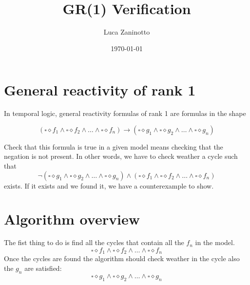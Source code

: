 \documentclass[11pt]{article}
\author{Luca Zaninotto}
\date{\today}
\title{GR(1) Verification}
\begin{document}
\maketitle
\tableofcontents

\section{General reactivity of rank 1}
\label{sec:org2691051}
In temporal logic, general reactivity formulas of rank 1 are
formulas in the shape

\[(\square\diamond f_1 \wedge \square\diamond f_2 \wedge \dots \wedge
  \square\diamond f_n) \rightarrow (\square\diamond g_1 \wedge
  \square\diamond g_2 \wedge \dots \wedge \square\diamond g_n)\]

Check that this formula is true in a given model means checking that
the negation is not present. In other words, we have to check
weather a cycle such that \[\neg(\square\diamond g_1 \wedge
  \square\diamond g_2 \wedge \dots \wedge \square\diamond g_n) \wedge
  (\square\diamond f_1 \wedge \square\diamond f_2 \wedge \dots \wedge
  \square\diamond f_n)\] exists. If it exists and we found it, we have
a counterexample to show.
\section{Algorithm overview}
\label{sec:org1dc3365}
The fist thing to do is find all the cycles that contain all the
\(f_n\) in the model. \[\square\diamond f_1 \wedge \square\diamond
  f_2 \wedge \dots \wedge \square\diamond f_n\] Once the cycles are
found the algorithm should check weather in the cycle also the
\(g_n\) are satisfied: \[\square\diamond g_1 \wedge \square\diamond
  g_2 \wedge \dots \wedge \square\diamond g_n\]
\end{document}
